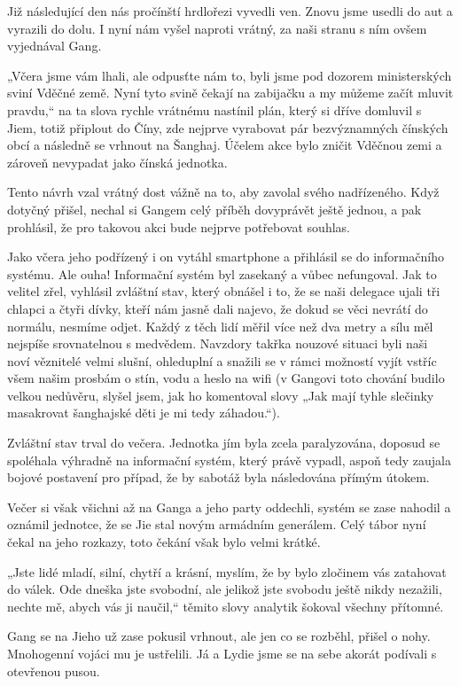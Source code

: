 Již následující den nás pročínští hrdlořezi vyvedli ven. Znovu jsme usedli do aut a vyrazili do dolu. I nyní nám vyšel naproti vrátný, za naši stranu s ním ovšem vyjednával Gang.

„Včera jsme vám lhali, ale odpusťte nám to, byli jsme pod dozorem ministerských sviní Vděčné země. Nyní tyto svině čekají na zabijačku a my můžeme začít mluvit pravdu,“ na ta slova rychle vrátnému nastínil plán, který si dříve domluvil s Jiem, totiž připlout do Číny, zde nejprve vyrabovat pár bezvýznamných čínských obcí a následně se vrhnout na Šanghaj. Účelem akce bylo zničit Vděčnou zemi a zároveň nevypadat jako čínská jednotka.

Tento návrh vzal vrátný dost vážně na to, aby zavolal svého nadřízeného. Když dotyčný přišel, nechal si Gangem celý příběh dovyprávět ještě jednou, a pak prohlásil, že pro takovou akci bude nejprve potřebovat souhlas.
 
Jako včera jeho podřízený i on vytáhl smartphone a přihlásil se do informačního systému. Ale ouha! Informační systém byl zasekaný a vůbec nefungoval. Jak to velitel zřel, vyhlásil zvláštní stav, který obnášel i to, že se naši delegace ujali tři chlapci a čtyři dívky, kteří nám jasně dali najevo, že dokud se věci nevrátí do normálu, nesmíme odjet. Každý z těch lidí měřil více než dva metry a sílu měl nejspíše srovnatelnou s medvědem. Navzdory takřka nouzové situaci byli naši noví věznitelé velmi slušní, ohleduplní a snažili se v rámci možností vyjít vstříc všem našim prosbám o stín, vodu a heslo na wifi (v Gangovi toto chování budilo velkou nedůvěru, slyšel jsem, jak ho komentoval slovy „Jak mají tyhle slečinky masakrovat šanghajské děti je mi tedy záhadou.“). 

Zvláštní stav trval do večera. Jednotka jím byla zcela paralyzována, doposud se spoléhala výhradně na informační systém, který právě vypadl, aspoň tedy zaujala bojové postavení pro případ, že by sabotáž byla následována přímým útokem.

Večer si však všichni až na Ganga a jeho party oddechli, systém se zase nahodil a oznámil jednotce, že se Jie stal novým armádním generálem. Celý tábor nyní čekal na jeho rozkazy, toto čekání však bylo velmi krátké.

„Jste lidé mladí, silní, chytří a krásní, myslím, že by bylo zločinem vás zatahovat do válek. Ode dneška jste svobodní, ale jelikož jste svobodu ještě nikdy nezažili, nechte mě, abych vás ji naučil,“ těmito slovy analytik šokoval všechny přítomné. 

Gang se na Jieho už zase pokusil vrhnout, ale jen co se rozběhl, přišel o nohy. Mnohogenní vojáci mu je ustřelili. Já a Lydie jsme se na sebe akorát podívali s otevřenou pusou.

